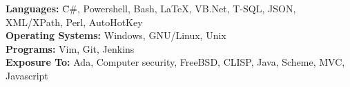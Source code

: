 

\begin{cvparagraph}

   \begin{tabbing}

      \textbf{Languages:} \hspace{5pc} \=
      C\#, Powershell, Bash, \LaTeX, VB.Net, T-SQL, JSON, XML/XPath, Perl, AutoHotKey \\

      \textbf{Operating Systems:} \>
      Windows, GNU/Linux, Unix \\
      
      \textbf{Programs:} \>
      Vim, Git, Jenkins \\

      \textbf{Exposure To:} \>
      Ada, Computer security, FreeBSD, CLISP, Java, Scheme, MVC, Javascript

   \end{tabbing}

\end{cvparagraph}
